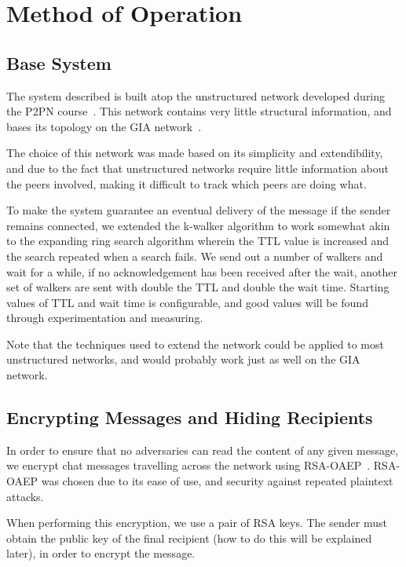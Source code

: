 \section{Method of Operation}

\subsection{Base System}
\label{subsec:base_system}

The system described is built atop the unstructured network developed during the P2PN course~\citep{P2PN}. This network contains very little structural information, and bases its topology on the GIA network~\citep{GIA}.

The choice of this network was made based on its simplicity and extendibility, and due to the fact that unstructured networks require little information about the peers involved, making it difficult to track which peers are doing what. 

To make the system guarantee an eventual delivery of the message if the sender remains connected, we extended the k-walker algorithm to work somewhat akin to the expanding ring search algorithm wherein the TTL value is increased and the search repeated when a search fails. We send out a number of walkers and wait for a while, if no acknowledgement has been received after the wait, another set of walkers are sent with double the TTL and double the wait time. Starting values of TTL and wait time is configurable, and good values will be found through experimentation and measuring.

Note that the techniques used to extend the network could be applied to most unstructured networks, and would probably work just as well on the GIA network.

\subsection{Encrypting Messages and Hiding Recipients}

In order to ensure that no adversaries can read the content of any given message, we encrypt chat messages travelling across the network using RSA-OAEP~\citep{OAEP}. RSA-OAEP was chosen due to its ease of use, and security against repeated plaintext attacks.

When performing this encryption, we use a pair of RSA keys. The sender must obtain the public key of the final recipient (how to do this will be explained later), in order to encrypt the message.

